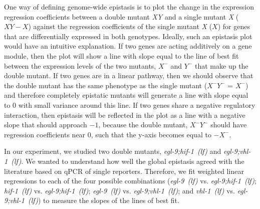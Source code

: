 \documentclass[9pt,twocolumn,twoside]{pnas-new}
\newcommand{\egl}{\emph{egl-9~(lf)}}
\newcommand{\vhl}{\emph{vhl-1~(lf)}}
\newcommand{\eglvhl}{\emph{egl-9;vhl-1~(lf)}}
\newcommand{\eglhif}{\emph{egl-9;hif-1~(lf)}}
\newcommand{\hif}{\emph{hif-1~(lf)}}
\begin{document}
One way of defining genome-wide epistasis is to plot
the change in the expression regression coefficients between a double
mutant \emph{XY} and a single mutant \emph{X} ($XY - X$) against
the regression coefficients of the single mutant \emph{X} ($X$) for genes
that are differentially expressed in both genotypes.
Ideally, such an epistasis plot would have an intuitive explanation.
If two genes are acting additively on a gene module, then the plot will show a line
with slope equal to the line of best fit between the expression levels of the
two mutants, $X^-$ and $Y^-$ that make up the double mutant.
If two genes are in a linear pathway, then we should observe that the double
mutant has the same phenotype as the single mutant ($X^-Y^-$ = $X^-$) and therefore
completely epistatic mutants will generate a line with slope equal to 0 with
small variance around this line.
If two genes share a negative regulatory interaction, then epistasis will be
reflected in the plot as a line with a negative slope that should approach $-1$,
because the double mutant, $X^-Y^-$ should have regression coefficients near 0,
such that the y-axis becomes equal to $-X^-$.

In our experiment, we studied two double mutants, \eglhif{} and \eglvhl{}.
We wanted to understand how well the global epistasis agreed with the literature
based on qPCR of single reporters. Therefore, we fit weighted linear regressions
to each of the four possible combinations (\egl{} vs. \eglhif{};
\hif{} vs. \eglhif{}; \egl{} vs. \eglvhl{}; and \vhl{} vs. \eglvhl{})
to measure the slopes of the lines of best fit.
\end{document}
